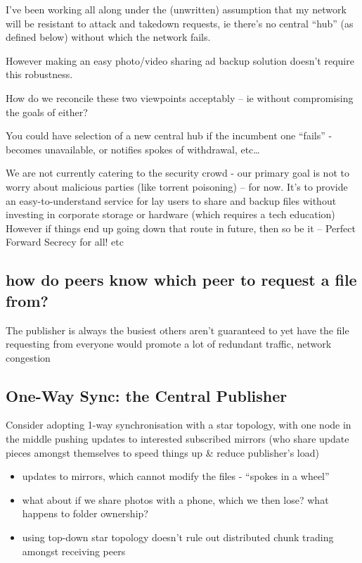 \documentclass[12pt,a4paper,]{book}
\begin{document}
I've been working all along under the (unwritten) assumption that my
network will be resistant to attack and takedown requests, ie there's no
central ``hub'' (as defined below) without which the network fails.

However making an easy photo/video sharing ad backup solution doesn't
require this robustness.

How do we reconcile these two viewpoints acceptably -- ie without
compromising the goals of either?

You could have selection of a new central hub if the incumbent one
``fails'' - becomes unavailable, or notifies spokes of withdrawal,
etc\ldots{}

We are not currently catering to the security crowd - our primary goal
is not to worry about malicious parties (like torrent poisoning) -- for
now. It's to provide an easy-to-understand service for lay users to
share and backup files without investing in corporate storage or
hardware (which requires a tech education) However if things end up
going down that route in future, then so be it -- Perfect Forward
Secrecy for all! etc

\subsection{how do peers know which peer to request a file
from?}\label{how-do-peers-know-which-peer-to-request-a-file-from}

The publisher is always the busiest others aren't guaranteed to yet have
the file requesting from everyone would promote a lot of redundant
traffic, network congestion

\subsection{One-Way Sync: the Central
Publisher}\label{one-way-sync-the-central-publisher}

Consider adopting 1-way synchronisation with a star topology, with one
node in the middle pushing updates to interested subscribed mirrors (who
share update pieces amongst themselves to speed things up \& reduce
publisher's load)

\begin{itemize}
\itemsep1pt\parskip0pt
\item
  updates to mirrors, which cannot modify the files - ``spokes in a
  wheel''
\item
  what about if we share photos with a phone, which we then lose? what
  happens to folder ownership?
\item
  using top-down star topology doesn't rule out distributed chunk
  trading amongst receiving peers
\end{itemize}
\end{document}
